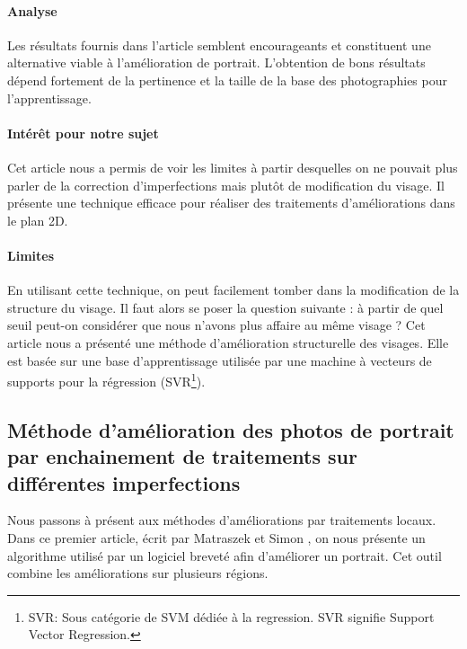 \documentclass[11pt, french,screen]{report-rd-info}
\begin{document}
\paragraph{Analyse}
Les résultats fournis dans l’article semblent encourageants et constituent une alternative viable à l’amélioration de portrait. L’obtention de bons résultats dépend fortement de la pertinence et la taille de la base des photographies pour l’apprentissage.
\paragraph{Intérêt pour notre sujet}
Cet article nous a permis de voir les limites à partir desquelles on ne pouvait plus parler de la correction d’imperfections mais plutôt de modification du visage. Il présente une technique efficace pour réaliser des traitements d’améliorations dans le plan 2D.
\paragraph{Limites}
En utilisant cette technique, on peut facilement tomber dans la modification de la structure du visage. Il faut alors se poser la question suivante : à partir de quel seuil peut-on considérer que nous n’avons plus affaire au même visage ?
Cet article nous a présenté une méthode d’amélioration structurelle des visages. Elle est basée sur une base d’apprentissage utilisée par une machine à vecteurs de supports pour la régression (SVR\footnote{SVR: Sous catégorie de SVM dédiée à la regression. SVR signifie Support Vector Regression.}).
\subsection{Méthode d’amélioration des photos de portrait par enchainement de traitements sur différentes imperfections}
Nous passons à présent aux méthodes d’améliorations par traitements locaux. Dans ce premier article, écrit par Matraszek et Simon \cite{Matraszek2004}, on nous présente un algorithme utilisé par un logiciel breveté afin d'améliorer un portrait. Cet outil combine les améliorations sur plusieurs régions.
\end{document}
